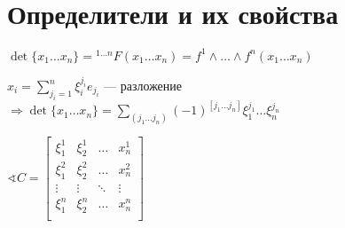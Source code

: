 \section{Определители и их свойства}

\begin{definition}
    \(\det\{x_1\ldots x_n\}={}^{1\ldots n}F(x_1\ldots x_n)=f^1\wedge\ldots\wedge f^n(x_1\ldots x_n)\)
\end{definition}

\(x_i=\sum\limits_{j_i=1}^n\xi_i^{j_i}e_{j_i}\) --- разложение \(\Rightarrow \det\{x_1\ldots x_n\}=\sum\limits_{(j_1\ldots j_n)}(-1)^{[j_1\ldots j_n]} \xi_1^{j_1}\ldots \xi_n^{j_n}\)

\(\sphericalangle C=\begin{bmatrix}
    \xi_1^1 & \xi_2^1 & \ldots & x_n^1 \\
    \xi_1^2 & \xi_2^2 & \ldots & x_n^2 \\
    \vdots & \vdots & \ddots & \vdots \\
    \xi_1^n & \xi_2^n & \ldots & x_n^n \\
\end{bmatrix}\)


